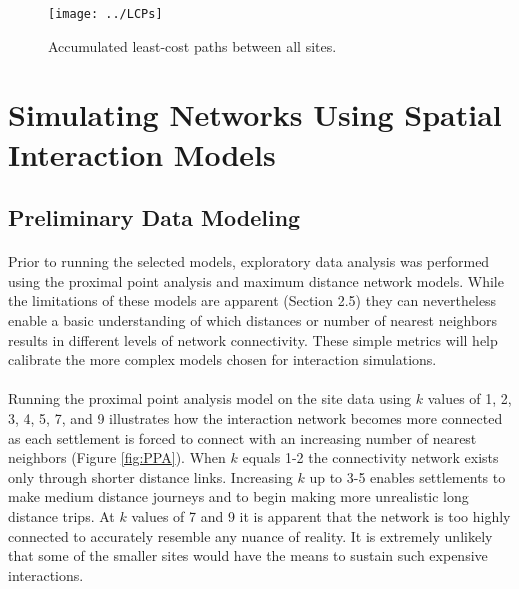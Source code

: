 \documentclass[12pt,a4paper]{thesis}
\begin{document}
\begin{figure}
\centering
\texttt{[image: ../LCPs]}
\caption{Accumulated least-cost paths between all sites.}
\label{fig:LCPs}
\end{figure}

\section{Simulating Networks Using Spatial Interaction Models}

\subsection{Preliminary Data Modeling}
\paragraph{}
Prior to running the selected models, exploratory data analysis was performed using the proximal point analysis and maximum distance network models. While the limitations of these models are apparent (Section 2.5) they can nevertheless enable a basic understanding of which distances or number of nearest neighbors results in different levels of network connectivity. These simple metrics will help calibrate the more complex models chosen for interaction simulations.

\paragraph{}
Running the proximal point analysis model on the site data using $k$ values of 1, 2, 3, 4, 5, 7, and 9 illustrates how the interaction network becomes more connected as each settlement is forced to connect with an increasing number of nearest neighbors (Figure \ref{fig:PPA}). When $k$ equals 1-2 the connectivity network exists only through shorter distance links. Increasing $k$ up to 3-5 enables settlements to make medium distance journeys and to begin making more unrealistic long distance trips. At $k$ values of 7 and 9 it is apparent that the network is too highly connected to accurately resemble any nuance of reality. It is extremely unlikely that some of the smaller sites would have the means to sustain such expensive interactions. 
\end{document}
